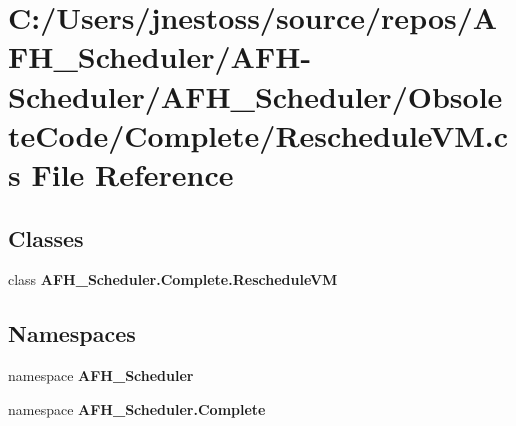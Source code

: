 \section{C\+:/\+Users/jnestoss/source/repos/\+A\+F\+H\+\_\+\+Scheduler/\+A\+F\+H-\/\+Scheduler/\+A\+F\+H\+\_\+\+Scheduler/\+Obsolete\+Code/\+Complete/\+Reschedule\+VM.cs File Reference}
\label{_reschedule_v_m_8cs}
\subsection*{Classes}
\begin{DoxyCompactItemize}
\item 
class \textbf{ A\+F\+H\+\_\+\+Scheduler.\+Complete.\+Reschedule\+VM}
\end{DoxyCompactItemize}
\subsection*{Namespaces}
\begin{DoxyCompactItemize}
\item 
namespace \textbf{ A\+F\+H\+\_\+\+Scheduler}
\item 
namespace \textbf{ A\+F\+H\+\_\+\+Scheduler.\+Complete}
\end{DoxyCompactItemize}
